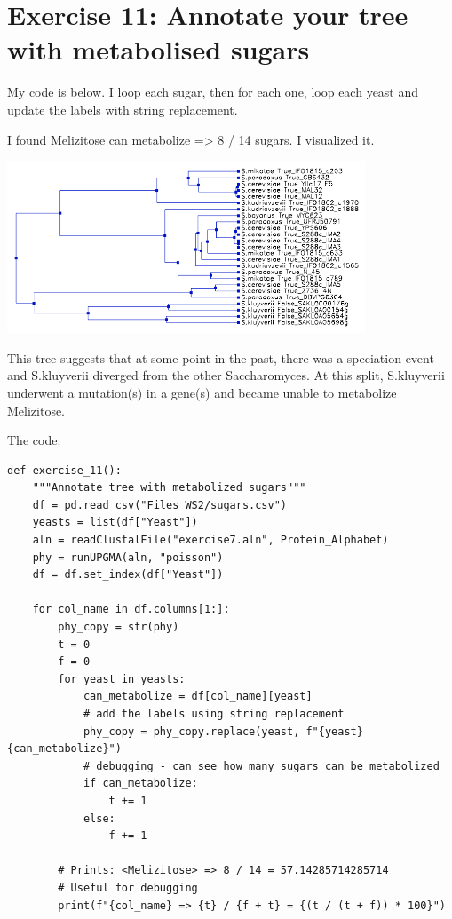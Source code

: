 \documentclass{article} %
\begin{document}
\section{Exercise 11: Annotate your tree with metabolised sugars}

My code is below. I loop each sugar, then for each one, loop each yeast and update the labels with string replacement.

I found Melizitose can metabolize => 8 / 14 sugars. I visualized it.

\includegraphics[width=0.8\textwidth]{images/tree2.png}

This tree suggests that at some point in the past, there was a speciation event and S.kluyverii diverged from the other Saccharomyces. At this split, S.kluyverii underwent a mutation(s) in a gene(s) and became unable to metabolize Melizitose.

The code:

\begin{verbatim}
def exercise_11():
    """Annotate tree with metabolized sugars"""
    df = pd.read_csv("Files_WS2/sugars.csv")
    yeasts = list(df["Yeast"])
    aln = readClustalFile("exercise7.aln", Protein_Alphabet)
    phy = runUPGMA(aln, "poisson")
    df = df.set_index(df["Yeast"])

    for col_name in df.columns[1:]:
        phy_copy = str(phy)
        t = 0
        f = 0
        for yeast in yeasts:
            can_metabolize = df[col_name][yeast]
            # add the labels using string replacement
            phy_copy = phy_copy.replace(yeast, f"{yeast} {can_metabolize}")
            # debugging - can see how many sugars can be metabolized
            if can_metabolize:
                t += 1
            else:
                f += 1

        # Prints: <Melizitose> => 8 / 14 = 57.14285714285714
        # Useful for debugging
        print(f"{col_name} => {t} / {f + t} = {(t / (t + f)) * 100}")
\end{verbatim}
\end{document}

